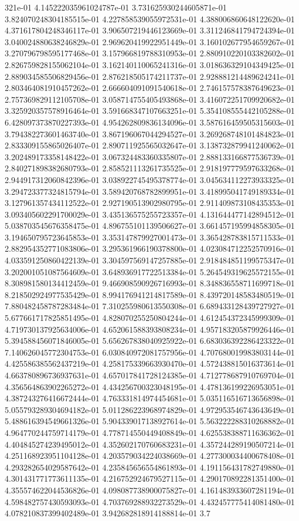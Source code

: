 321e-01	4.145222035961024787e-01	3.731625930244605871e-01	3.824070248304185515e-01	4.227858539055972531e-01	4.388006860648122620e-01	4.371617804248346117e-01	3.906507219446123669e-01	3.311246841794724394e-01	3.040024880638246829e-01	2.969620419922951449e-01	3.160102677954659267e-01	3.270796798595177468e-01	3.157966819788310953e-01	2.880910220103382602e-01	2.826759828155062104e-01	3.162140110065241316e-01	3.018636329104349425e-01	2.889034585506829456e-01	2.876218505174211737e-01	2.928881214489624241e-01	2.803464081910457262e-01	2.666604091091540618e-01	2.746157578387649623e-01	2.757369829112105708e-01	3.058714755405493868e-01	3.416072251709920682e-01	3.325920357578916464e-01	3.591668347107663251e-01	5.354108555442105288e-01	6.428097373870227393e-01	4.954262809836134096e-01	3.587616459505315603e-01	3.794382273601463740e-01	3.867196067044294527e-01	3.269268748101484823e-01	2.833309155865026407e-01	2.890711925565032647e-01	3.138732879941240062e-01	3.202489173358148422e-01	3.067324483360335807e-01	2.888133166877536739e-01	2.840271898382680793e-01	2.858521113261735525e-01	2.918197779597633268e-01	2.944917312060842396e-01	3.038922745495378774e-01	3.045634112273933325e-01	3.294723377324815794e-01	3.589420768782899951e-01	3.418995041749189334e-01	3.127961357434112522e-01	2.927190513902980795e-01	2.911409873108435353e-01	3.093405602291700029e-01	3.435136575255723357e-01	4.131644477142894512e-01	5.038703545676358475e-01	4.896755101139506627e-01	3.661457195994858305e-01	3.194650795723645853e-01	3.353147879927001473e-01	3.365428783815711533e-01	2.882954352771083806e-01	3.295361966190378800e-01	4.023084712252570916e-01	4.033591250860422139e-01	3.304597569147257885e-01	2.918484851199575347e-01	3.202001051087564609e-01	3.648936917722513384e-01	5.264549319625572155e-01	8.308981580134412459e-01	9.466908590926716993e-01	8.348836558711699718e-01	8.218502924977535429e-01	8.994176941214817589e-01	8.439720148583480519e-01	7.880482458787283484e-01	7.310255980613550308e-01	6.689433128439727927e-01	5.677661717825851495e-01	4.828070255250804244e-01	4.612454372345999309e-01	4.719730137925634006e-01	4.652061588393808234e-01	4.957183205879926446e-01	5.394588456071846005e-01	5.656267838040925922e-01	6.683036392286423322e-01	7.140626045772304753e-01	6.030840972081757956e-01	4.707680019983803144e-01	4.425586385562437219e-01	4.258175339663930470e-01	4.572438815016373614e-01	4.663780896736937631e-01	4.657017841728124385e-01	4.712778687910769704e-01	4.356564863902265272e-01	4.434256700323048195e-01	4.478136199226953051e-01	4.387243276416672444e-01	4.763331814974454681e-01	5.035116516713656898e-01	5.055793289304694182e-01	5.011286223968974829e-01	4.972953546743643649e-01	5.488616394549661326e-01	5.904339017138927614e-01	5.563222288310268882e-01	4.964770244759714179e-01	4.778714550449408849e-01	4.625538388711636362e-01	4.404845274239495012e-01	4.352602170760683231e-01	4.357244289190507214e-01	4.251168923951104128e-01	4.203579034224038669e-01	4.277300034400678408e-01	4.293282654029587642e-01	4.235845656554861893e-01	4.191156431782749880e-01	4.301431771773611135e-01	4.216752924679527115e-01	4.290170892281351400e-01	4.355574622044536826e-01	4.098087738900075827e-01	4.161483933607281194e-01	4.598482757430593093e-01	4.703769288932273529e-01	4.432457775414081480e-01	4.078210837399402489e-01	3.942682818914188814e-01	3.7